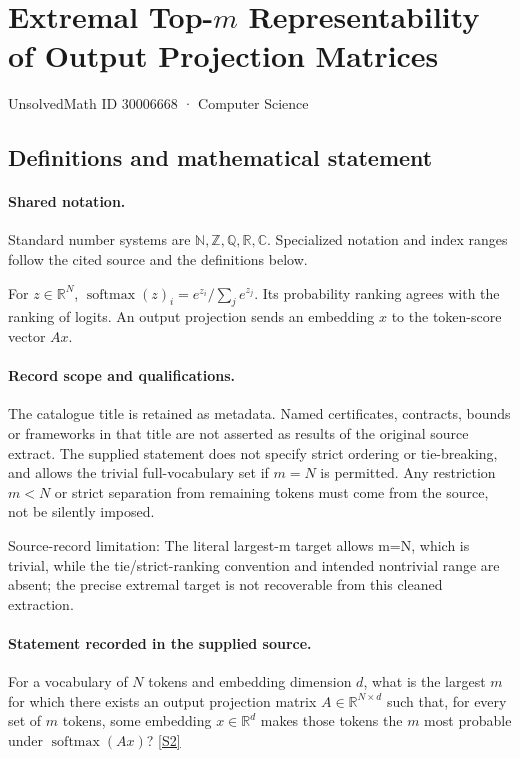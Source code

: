 \documentclass[11pt]{article}
\newcommand{\sref}[2]{\hyperlink{source:#1:#2}{[S#2]}}
\begin{document}
\setcounter{section}{30006667}
\section{Extremal Top-$m$ Representability of Output Projection Matrices}\label{30006668}
{\small\sffamily UnsolvedMath ID 30006668 · Computer Science}
\subsection{Definitions and mathematical statement}

\paragraph{Shared notation.}Standard number systems are $\mathbb N,\mathbb Z,\mathbb Q,\mathbb R,\mathbb C$. Specialized notation and index ranges follow the cited source and the definitions below.


For $z\in\mathbb R^N$, $\operatorname{softmax}(z)_i=e^{z_i}/\sum_j e^{z_j}$. Its probability ranking agrees with the ranking of logits. An output projection sends an embedding $x$ to the token-score vector $Ax$.
\paragraph{Record scope and qualifications.}
The catalogue title is retained as metadata. Named certificates, contracts, bounds or frameworks in that title are not asserted as results of the original source extract.
The supplied statement does not specify strict ordering or tie-breaking, and allows the trivial full-vocabulary set if $m=N$ is permitted. Any restriction $m<N$ or strict separation from remaining tokens must come from the source, not be silently imposed.

Source-record limitation: The literal largest-m target allows m=N, which is trivial, while the tie/strict-ranking convention and intended nontrivial range are absent; the precise extremal target is not recoverable from this cleaned extraction.
\paragraph{Statement recorded in the supplied source.}
For a vocabulary of $N$ tokens and embedding dimension $d$, what is the largest $m$ for which there exists an output projection matrix $A\in\mathbb R^{N\times d}$ such that, for every set of $m$ tokens, some embedding $x\in\mathbb R^d$ makes those tokens the $m$ most probable under $\operatorname{softmax}(Ax)$? \sref{30006668}{2}
\end{document}
